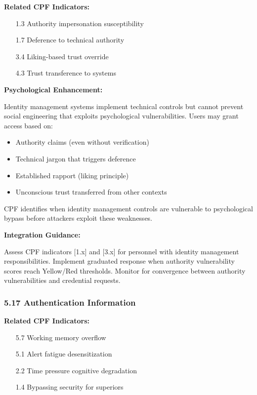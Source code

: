 \documentclass[11pt,a4paper]{article}
\begin{document}
\textbf{Related CPF Indicators:}
\begin{itemize}
\item [1.3] Authority impersonation susceptibility
\item [1.7] Deference to technical authority
\item [3.4] Liking-based trust override
\item [4.3] Trust transference to systems
\end{itemize}

\textbf{Psychological Enhancement:}

Identity management systems implement technical controls but cannot prevent social engineering that exploits psychological vulnerabilities. Users may grant access based on:
\begin{itemize}
\item Authority claims (even without verification)
\item Technical jargon that triggers deference
\item Established rapport (liking principle)
\item Unconscious trust transferred from other contexts
\end{itemize}

CPF identifies when identity management controls are vulnerable to psychological bypass before attackers exploit these weaknesses.

\textbf{Integration Guidance:}

Assess CPF indicators [1.x] and [3.x] for personnel with identity management responsibilities. Implement graduated response when authority vulnerability scores reach Yellow/Red thresholds. Monitor for convergence between authority vulnerabilities and credential requests.

\subsubsection{5.17 Authentication Information}

\textbf{Related CPF Indicators:}
\begin{itemize}
\item [5.7] Working memory overflow
\item [5.1] Alert fatigue desensitization
\item [2.2] Time pressure cognitive degradation
\item [1.4] Bypassing security for superiors
\end{itemize}
\end{document}
